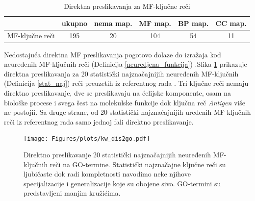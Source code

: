 \begin{table}[htpb]
\begin{tabular}{|r|c|c|c|c|c|}
  \hline
                   & ukupno & nema map. &  MF map. & BP map. & CC map.      \\
  \hline
   MF-ključne reči & 195    &  20       &  104     & 54      & 11           \\
  \hline
\end{tabular}
  \centering
  \caption{Direktna preslikavanja za MF-ključne reči}
  \label{tab:direktna_map}
\end{table}

Nedostajuća direktna MF preslikavanja pogotovo dolaze do izražaja kod neuređenih MF-ključnih reči (Definicija \ref{neuredjena_funkcija}) .Slika
\ref{fig:KWtop20dis} prikazuje direktna preslikavanja za 20 statistički
najznačajnijih neuređenih MF-ključnih (Definicija \ref{stat_naj}) reči preuzetih iz referentnog rada
\parencite{Xie2007}.  Tri ključne reči nemaju direktno preslikavanje, dve se
preslikavaju na ćelijske komponente, osam na biološke procese i svega šest na
molekulske funkcije dok ključna reč \textit{Antigen} više ne postojii. Sa druge
strane, od 20 statistički najznačajnijih uređenih MF-ključnih reči iz
referentnog rada samo jednoj fali direktno preslikavanje.

\begin{figure}[!th]
\centering
\hspace*{-1.5cm} 
\texttt{[image: Figures/plots/kw\_dis2go.pdf]}
\caption {
  Direktno preslikavanje 20 statistički najznačajnijih neuređenih MF-ključnih reči
  \parencite{Xie2007} na GO-termine.  Statistički najznačajne ključne reči su
  ljubičaste dok radi kompletnosti navodimo neke njihove specijalizacije i
  generalizacije koje su obojene sivo. GO-termini su predstavljeni manjim
  kružićima.
}
\label{fig:KWtop20dis}
\end{figure}

